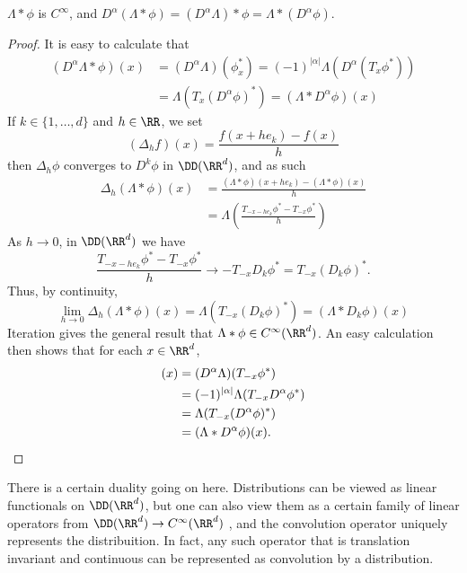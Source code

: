 \begin{theorem}
    $\Lambda * \phi$ is $C^\infty$, and $D^\alpha(\Lambda * \phi) = (D^\alpha \Lambda) * \phi = \Lambda * (D^\alpha \phi)$.
\end{theorem}
\begin{proof}
    It is easy to calculate that
    \begin{align*}
        (D^\alpha \Lambda * \phi)(x) &= (D^\alpha \Lambda)(\phi^*_x) = (-1)^{|\alpha|} \Lambda(D^\alpha (T_x \phi^*))\\
        &= \Lambda(T_x (D^\alpha \phi)^*) = (\Lambda * D^\alpha \phi)(x)
    \end{align*}
    If $k \in \{ 1, \dots, d \}$ and $h \in \RR$, we set
    \[ (\Delta_h f)(x) = \frac{f(x + he_k) - f(x)}{h} \]
    then $\Delta_h \phi$ converges to $D^k \phi$ in $\DD(\RR^d)$, and as such
    \begin{align*}
      \Delta_h(\Lambda * \phi)(x) &= \frac{(\Lambda * \phi)(x + he_k) - (\Lambda * \phi)(x)}{ h}\\
      &= \Lambda \left( \frac{T_{-x - he_k} \phi^* - T_{-x} \phi^*}{h} \right)
    \end{align*}
    As $h \to 0$, in $\DD(\RR^d)$ we have
    \[ \frac{T_{-x - he_k} \phi^* - T_{-x} \phi^*}{h} \to - T_{-x} D_k \phi^* = T_{-x} (D_k \phi)^*. \]
    Thus, by continuity,
    \[ \lim_{h \to 0} \Delta_h(\Lambda * \phi)(x) = \Lambda(T_{-x} (D_k \phi)^*) = (\Lambda * D_k \phi)(x) \]
    Iteration gives the general result that $\Lambda * \phi \in C^\infty(\RR^d)$. An easy calculation then shows that for each $x \in \RR^d$,
    \begin{align*}
      [(D^\alpha \Lambda) * \phi](x) &= (D^\alpha \Lambda)(T_{-x} \phi^*)\\
      &= (-1)^{|\alpha|} \Lambda(T_{-x} D^\alpha \phi^*)\\
      &= \Lambda(T_{-x} (D^\alpha \phi)^*)\\
      &= (\Lambda * D^\alpha \phi)(x). \qedhere
    \end{align*}
\end{proof}

There is a certain duality going on here. Distributions can be viewed as linear functionals on $\DD(\RR^d)$, but one can also view them as a certain family of linear operators from $\DD(\RR^d) \to C^\infty(\RR^d)$ , and the convolution operator uniquely represents the distribuition. In fact, any such operator that is translation invariant and continuous can be represented as convolution by a distribution.

